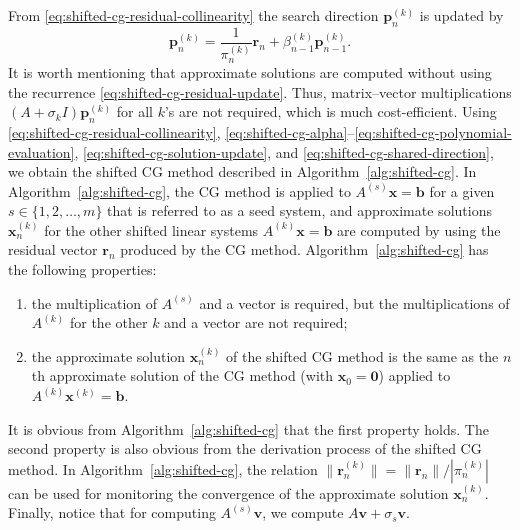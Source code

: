 {From \eqref{eq:shifted-cg-residual-collinearity} the search direction $\bm p_n^{(k)}$ is updated by}
\begin{equation}\label{eq:shifted-cg-shared-direction}\bm p_n^{(k)}=\frac1{\pi_n^{(k)}}\bm r_n+\beta_{n-1}^{(k)}\bm p_{n-1}^{(k)}.\end{equation}
{It is worth mentioning that approximate solutions are computed without using the recurrence \eqref{eq:shifted-cg-residual-update}. Thus, matrix--vector multiplications $(A+\sigma_k I)\bm p_n^{(k)}$ for all $k$'s are not required, which is much cost-efficient.}
{Using \eqref{eq:shifted-cg-residual-collinearity}, \eqref{eq:shifted-cg-alpha}--\eqref{eq:shifted-cg-polynomial-evaluation}, \eqref{eq:shifted-cg-solution-update}, and \eqref{eq:shifted-cg-shared-direction}, we obtain the shifted CG method described in Algorithm\ \ref{alg:shifted-cg}. In Algorithm\ \ref{alg:shifted-cg}, the CG method is applied to $A^{(s)}\bm x=\bm b$ for a given $s\in\{1,2,\ldots,m\}$ that is referred to as a seed system, and approximate solutions $\bm x_n^{(k)}$ for the other shifted linear systems $A^{(k)}\bm x=\bm b$ are computed by using the residual vector $\bm r_n$ produced by the CG method.}
{Algorithm\ \ref{alg:shifted-cg} has the following properties:}
\begin{enumerate}
\item {the multiplication of $A^{(s)}$ and a vector is required, but the multiplications of $A^{(k)}$ for the other $k$ and a vector are not required;}
\item {the approximate solution $\bm x_n^{(k)}$ of the shifted CG method is the same as the $n$th approximate solution of the CG method (with $\bm x_0=\bm0$) applied to $A^{(k)}\bm x^{(k)}=\bm b$.}
\end{enumerate}
{It is obvious from Algorithm\ \ref{alg:shifted-cg} that the first property holds. The second property is also obvious from the derivation process of the shifted CG method. In Algorithm\ \ref{alg:shifted-cg}, the relation $\|\bm r_n^{(k)}\|=\|\bm r_n\|/|\pi_n^{(k)}|$ can be used for monitoring the convergence of the approximate solution $\bm x_n^{(k)}$. Finally, notice that for computing $A^{(s)}\bm v$, we compute $A\bm v+\sigma_s\bm v$.}
